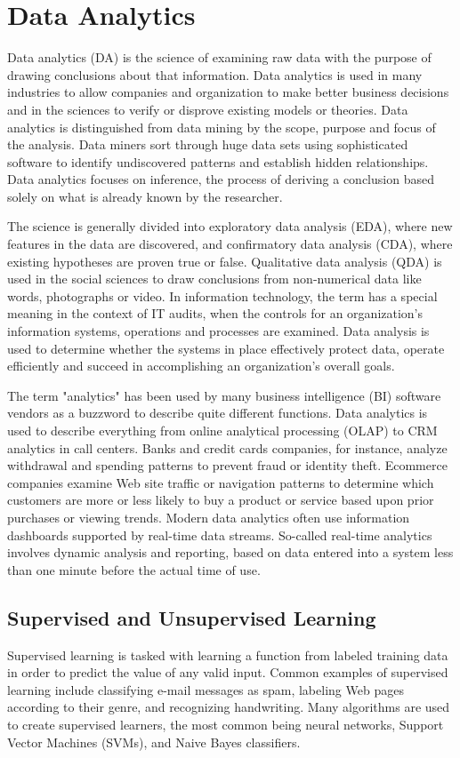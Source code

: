 \documentclass[12pt]{article}
\begin{document}
\section{Data Analytics}
Data analytics (DA) is the science of examining raw data with the purpose of drawing conclusions about that information. Data analytics is used in many industries to allow companies and organization to make better business decisions and in the sciences to verify or disprove existing models or theories. Data analytics is distinguished from data mining by the scope, purpose and focus of the analysis. Data miners sort through huge data sets using sophisticated software to identify undiscovered patterns and establish hidden relationships. Data analytics focuses on inference, the process of deriving a conclusion based solely on what is already known by the researcher.

The science is generally divided into exploratory data analysis (EDA), where new features in the data are discovered, and confirmatory data analysis (CDA), where existing hypotheses are proven true or false. Qualitative data analysis (QDA) is used in the social sciences to draw conclusions from non-numerical data like words, photographs or video. In information technology, the term has a special meaning in the context of IT audits, when the controls for an organization's information systems, operations and processes are examined. Data analysis is used to determine whether the systems in place effectively protect data, operate efficiently and succeed in accomplishing an organization's overall goals.

The term "analytics" has been used by many business intelligence (BI) software vendors as a buzzword to describe quite different functions. Data analytics is used to describe everything from online analytical processing (OLAP) to CRM analytics in call centers. Banks and credit cards companies, for instance, analyze withdrawal and spending patterns to prevent fraud or identity theft. Ecommerce companies examine Web site traffic or navigation patterns to determine which customers are more or less likely to buy a product or service based upon prior purchases or viewing trends. Modern data analytics often use information dashboards supported by real-time data streams. So-called real-time analytics involves dynamic analysis and reporting, based on data entered into a system less than one minute before the actual time of use.

\subsection{Supervised and Unsupervised Learning}
Supervised learning is tasked with learning a function from labeled training data in order to predict the value of any valid input. Common examples of supervised learning include classifying e-mail messages as spam, labeling Web pages according to their genre, and recognizing handwriting. Many algorithms are used to create supervised learners, the most common being neural networks, Support Vector Machines (SVMs), and Naive Bayes classifiers.
\end{document}
